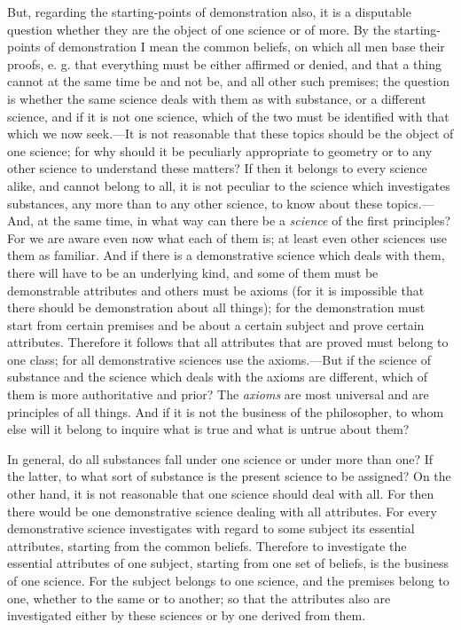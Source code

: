 But, regarding the starting-points of demonstration also, it is a disputable question whether they are the object of one science or of more. By the starting-points of demonstration I mean the common beliefs, on which all men base their proofs, e. g. that everything must be either affirmed or denied, and that a thing cannot at the same time be and not be, and all other such premises; the question is whether the same science deals with them as with substance, or a different science, and if it is not one science, which of the two must be identified with that which we now seek.—It is not reasonable that these topics should be the object of one science; for why should it be peculiarly appropriate to geometry or to any other science to understand these matters? If then it belongs to every science alike, and cannot belong to all, it is not peculiar to the science which investigates substances, any more than to any other science, to know about these topics.—And, at the same time, in what way can there be a \emph{science} of the first principles? For we are aware even now what each of them is; at least even other sciences use them as familiar. And if there is a demonstrative science which deals with them, there will have to be an underlying kind, and some of them must be demonstrable attributes and others must be axioms (for it is impossible that there should be demonstration about all things); for the demonstration must start from certain premises and be about a certain subject and prove certain attributes. Therefore it follows that all attributes that are proved must belong to one class; for all demonstrative sciences use the axioms.—But if the science of substance and the science which deals with the axioms are different, which of them is more authoritative and prior? The \emph{axioms} are most universal and are principles of all things. And if it is not the business of the philosopher, to whom else will it belong to inquire what is true and what is untrue about them?

In general, do all substances fall under one science or under more than one? If the latter, to what sort of substance is the present science to be assigned? On the other hand, it is not reasonable that one science should deal with all. For then there would be one demonstrative science dealing with all attributes. For every demonstrative science investigates with regard to some subject its essential attributes, starting from the common beliefs. Therefore to investigate the essential attributes of one subject, starting from one set of beliefs, is the business of one science. For the subject belongs to one science, and the premises belong to one, whether to the same or to another; so that the attributes also are investigated either by these sciences or by one derived from them.

